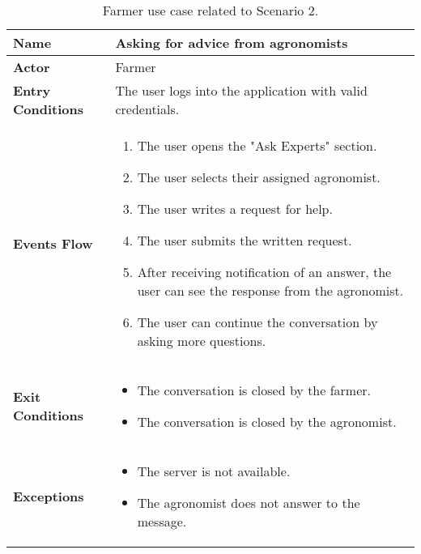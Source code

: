 \begin{table}[hbt!]
\centering
\caption{\label{tab:addOne{table_counter}}Farmer use case related to Scenario 2.}
\renewcommand{\arraystretch}{1.25}

\begin{tabular}{|l|>{\raggedright\arraybackslash}m{12cm}|}

    \hline
    \textbf{Name} & Asking for advice from agronomists\\
    \hline
   	\textbf{Actor} & Farmer\\
    \hline
    \textbf{Entry Conditions} & The user logs into the application with valid credentials.\\
    \hline
    
    \textbf{Events Flow} & 
    		\begin{enumerate}
    			\item The user opens the "Ask Experts" section.
    			\item The user selects their assigned agronomist.
    			\item The user writes a request for help.
    			\item The user submits the written request.
    			\item After receiving notification of an answer, the user can see the response from the agronomist.
    			\item The user can continue the conversation by asking more questions.
    		\end{enumerate}
    	\\
    \hline
    \textbf{Exit Conditions} & \begin{itemize}
    	\item The conversation is closed by the farmer.
    	\item The conversation is closed by the agronomist.
    	\end{itemize}
    	\\
    \hline
    \textbf{Exceptions} & 
    		\begin{itemize}
    		    	\item The server is not available.
    			\item The agronomist does not answer to the message.
    		\end{itemize}
    \\
    \hline
\end{tabular}
\end{table}